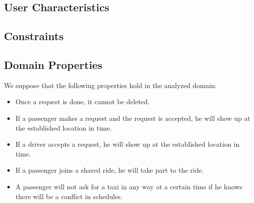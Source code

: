\subsection{User Characteristics}

\subsection{Constraints}

\subsection{Domain Properties}
We suppose that the following properties hold in the analyzed domain:
	\begin{itemize}
		\item Once a request is done, it cannot be deleted.
		\item If a passenger makes a request and the request is accepted, he will show up at the established location in time.
		\item If a driver accepts a request, he will show up at the established location in time.
		\item If a passenger joins a shared ride, he will take part to the ride.
		\item A passenger will not ask for a taxi in any way at a certain time if he knows there will be a conflict in schedules.
	\end{itemize}
	
